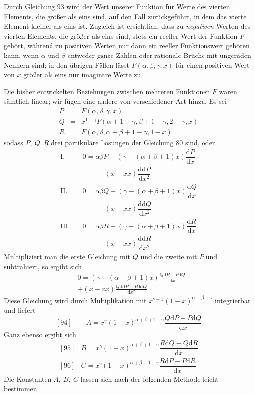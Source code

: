 Durch Gleichung 93 wird der Wert unserer Funktion für Werte des vierten Elements, die größer als eins sind, auf den Fall zurückgeführt, in dem das vierte Element kleiner als eins ist. Zugleich ist ersichtlich, dass zu \textit{negativen} Werten des vierten Elements, die größer als eins sind, stets ein reeller Wert der Funktion \(F\) gehört, während zu positiven Werten nur dann ein reeller Funktionswert gehören kann, wenn \(\alpha\) und \(\beta\) entweder ganze Zahlen oder rationale Brüche mit ungeraden Nennern sind; in den übrigen Fällen lässt \(F(\alpha,\beta,\gamma,x)\) für einen positiven Wert von \(x\) größer als eins nur imaginäre Werte zu.

Die bisher entwickelten Beziehungen zwischen mehreren Funktionen \(F\) waren sämtlich linear; wir fügen eine andere von verschiedener Art hinzu. Es sei
\[
\begin{array}{rcl}
P&=&F(\alpha,\beta,\gamma,x)\\
Q&=&x^{1-\gamma}F(\alpha+1-\gamma,\beta+1-\gamma,2-\gamma,x)\\
R&=&F(\alpha,\beta,\alpha+\beta+1-\gamma,1-x)
\end{array}
\]
sodass \(P,\ Q.\ R\) drei partikuläre Lösungen der Gleichung 80 sind, oder
\[
\begin{aligned}
\mathrm{I.}\quad&0=\alpha\beta P-(\gamma-(\alpha+\beta+1)x)\dfrac{\mathrm dP}{\mathrm dx}\\&\qquad-(x-xx)\dfrac{\mathrm{dd}P}{\mathrm dx^2}\\[4pt]
\mathrm{II.}\quad&0=\alpha\beta Q-(\gamma-(\alpha+\beta+1)x)\dfrac{\mathrm dQ}{\mathrm dx}\\&\qquad-(x-xx)\dfrac{\mathrm{dd}Q}{\mathrm dx^2}\\[4pt]
\mathrm{III.}\quad&0=\alpha\beta R-(\gamma-(\alpha+\beta+1)x)\dfrac{\mathrm dR}{\mathrm dx}\\&\qquad-(x-xx)\dfrac{\mathrm{dd}R}{\mathrm dx^2}
\end{aligned}
\]
Multipliziert man die erste Gleichung mit \(Q\) und die zweite mit \(P\) und subtrahiert, so ergibt sich
\[
\begin{aligned}&0=(\gamma-(\alpha+\beta+1)x)\frac{Q\mathrm dP-P\mathrm dQ}{\mathrm dx}\\&+(x-xx)\frac{Q\mathrm{dd}P-P\mathrm{dd}Q}{\mathrm dx^2}\end{aligned}
\]
Diese Gleichung wird durch Multiplikation mit \(x^{\gamma-1}(1-x)^{\alpha+\beta-\gamma}\) integrierbar und liefert
\[
[94]\qquad A=x^\gamma(1-x)^{\alpha+\beta+1-\gamma}\frac{Q\mathrm dP-P\mathrm dQ}{\mathrm dx}
\]
Ganz ebenso ergibt sich
\[
\begin{array}{rl}
[95]&B=x^\gamma(1-x)^{\alpha+\beta+1-\gamma}\dfrac{R\mathrm dQ-Q\mathrm dR}{\mathrm dx}\\[11pt]
[96]&C=x^\gamma(1-x)^{\alpha+\beta+1-\gamma}\dfrac{R\mathrm dP-P\mathrm dR}{\mathrm dx}
\end{array}
\]
Die Konstanten \(A,\ B,\ C\) lassen sich nach der folgenden Methode leicht bestimmen.

